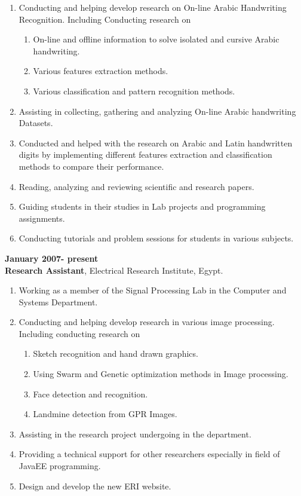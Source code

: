 \documentclass{article}
\begin{document}
 \begin{enumerate}
   \item Conducting and helping develop research on On-line Arabic Handwriting
   Recognition.  Including Conducting research on
    \begin{enumerate}
      \item On-line and offline information to solve isolated and cursive Arabic handwriting.
      \item Various features extraction methods.
      \item Various classification and pattern recognition methods.
   \end{enumerate}
   \item Assisting in collecting, gathering and analyzing On-line Arabic handwriting Datasets.
 \item Conducted and helped with the research on Arabic and Latin handwritten digits by implementing different features extraction and classification methods to compare their performance.
 \item Reading, analyzing and reviewing scientific and research papers.
 \item Guiding students in their studies in Lab projects and programming
 assignments.
 \item Conducting tutorials and problem sessions for students in various
 subjects.
\end{enumerate}

 \textbf{January 2007- present}\\
 \textbf{Research Assistant}, Electrical Research Institute, Egypt.
 \begin{enumerate}
\item Working as a member of the Signal Processing Lab in the Computer and
Systems Department.
\item Conducting and helping develop research in various image processing. Including conducting research on
\begin{enumerate}
  \item Sketch recognition and hand drawn graphics.
  \item Using Swarm and Genetic optimization methods in Image processing.
  \item Face detection and recognition.
\item Landmine detection from GPR Images.
  \end{enumerate}
 \item Assisting in the research project undergoing in the department.

 \item Providing a technical support for other researchers especially in field
 of JavaEE programming.
 \item Design and develop the new ERI website.
\end{enumerate}
\end{document}
